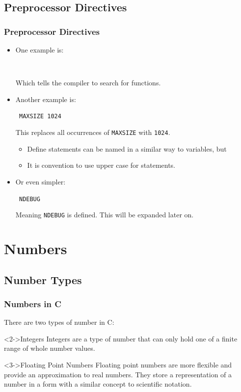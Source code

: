 \documentclass[smaller,handout,table]{beamer}
\begin{document}
\subsection{Preprocessor Directives}
\begin{frame}
\frametitle{Preprocessor Directives}
\begin{itemize}
\item<+-> One example is:
\begin{center}
\tt {} 
\end{center}
Which tells the compiler to search  for functions.
\item<+-> Another example is:
\begin{center}
\tt {} MAXSIZE 1024
\end{center}
This replaces all occurrences of {\tt MAXSIZE} with {\tt 1024}.
\begin{itemize}
\item Define statements can be named in a similar way to variables, but
\item It is convention to use upper case for  statements.
\end{itemize}
\item<+-> Or even simpler:
\begin{center}
\tt {} NDEBUG
\end{center}
Meaning {\tt NDEBUG} is defined. This will be expanded later on.
\end{itemize}
\end{frame}


\section{Numbers}
\subsection{Number Types}
\begin{frame}[fragile]
\frametitle{Numbers in C}
There are two types of number in C:
\begin{block}<2->{Integers}
Integers are a type of number that can only hold one of a finite range of whole number values.
\end{block}
\begin{block}<3->{Floating Point Numbers}
Floating point numbers are more flexible and provide an approximation to real numbers. They store a representation of a number in a form with a similar concept to scientific notation.
\end{block}
\end{frame}
\end{document}
